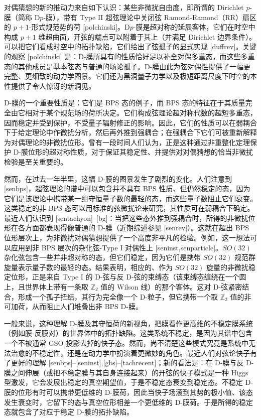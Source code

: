 \documentclass[11pt,a4paper]{ctexart}
\begin{document}
对偶猜想的新的推动力来自如下认识：某些非微扰自由度，即所谓的 Dirichlet \(p\)-膜（简称 D\(p\)-膜），带有 Type II 超弦理论中关闭弦 Ramond-Ramond（RR）扇区的 \(p+1\)-形式规范势的荷 [polchinski]。D\(p\)-膜是超对称的延展客体，它们在时空中构成 \(p+1\) 维超曲面，开弦的端点可以附着于其上（并满足 Dirichlet 边界条件）。可以把它们看成时空中的拓扑缺陷，它们给出了弦孤子的显式实现 [duffrev]。关键的观察 [polchinski] 是：D-膜所具有的性质恰好足以补全对偶多重态，而这些多重态的其他成员是基本弦态与普通的场论孤子。D-膜由此为弦对偶性提供了一幅更完整、更细致的动力学图景。它们还为黑洞量子力学以及极短距离尺度下时空的本性提供了令人惊讶的新洞见。

D-膜的一个重要性质是：它们是 BPS 态的例子，而 BPS 态的特征在于其质量完全由它相对于某个规范场的荷所决定。它们构成弦理论超对称代数的超短多重态，因而稳定并受到保护，不受量子辐射修正的影响。因此，它们的性质可以在弱耦合下于给定理论中作微扰分析，然后再外推到强耦合；在强耦合下它们可被重新解释为对偶理论的非微扰位形。曾有一段时间人们认为，正是这种通过非重整化定理保护 D-膜位形的超对称性质，对于保证其稳定性、并提供对对偶猜想的恰当非微扰检验是至关重要的。

然而，在过去一年半里，这幅 D-膜的图景发生了剧烈的变化。人们注意到 [senbps]，超弦理论的谱中可以包含并不具有 BPS 性质、但仍然稳定的态，因为它们是该理论中携带某一组守恒量子数的最轻的态，而这些量子数阻止它们衰变。这类稳定的非 BPS 态可以用标准的弦微扰论来研究，其性质可在弱耦合下确定。最近人们认识到 [sentachyon]--[bg]：当把这些态外推到强耦合时，所得的非微扰位形在各方面都表现得像普通的 D-膜（近期综述参见 [senrev]）。这就在超出 BPS 位形层次上，为非微扰对偶猜想提供了一个高度非平凡的检验。例如，这一想法可以应用到非 BPS 层次的杂化弦-Type I 对偶性上 [seninst,senparticle]。\(SO(32)\) 杂化弦包含一些并非超对称的态，但它们稳定，因为它们是携带 \(SO(32)\) 规范群旋量表示量子数的最轻的态。结果表明，相应的、作为 \(SO(32)\) 旋量的非微扰稳定位形，正是来自 Type I 的 D-弦与反 D-弦的束缚态（该束缚态缠绕在一个圆上，且世界体上带有一条取 \({\mathbb{Z}}_2\) 值的 Wilson 线）的那个客体。这对 D-弦紧密结合，形成一个孤子扭结，其行为完全像一个 D-粒子，但它携带一个取 \({\mathbb{Z}}_2\) 值的非可加荷，从而阻止人们堆叠出非 BPS D-膜。

一般来说，这种理解 D-膜及其守恒荷的新视角，把膜看作更高维的不稳定膜系统（例如膜-反膜对）的世界体中的拓扑缺陷。这类系统不稳定，是因为其谱中包含一个不被通常 GSO 投影去掉的快子态。然而，尚不清楚这些模式究竟是系统中无法治愈的不稳定性，还是在动力学中扮演着更微妙的角色。最近人们对弦论快子有了更好的理解 [senbps]--[seninst],[gbs]--[tachrecent]；新的看法是：在 D-膜与反 D-膜之间伸展（或把不稳定膜与其自身连接起来）的开弦的快子模式是一种 Higgs 型激发，它会发展出稳定的真空期望值，于是不稳定态衰变到稳定态。不稳定 D-膜的位形有时可以携带更低维的 D-膜荷，因此当快子场滚到其势的极小值、该态发生衰变时，它留下的态与真空位形相差一个更低维的 D-膜荷。于是所得的稳定态就包含了对应于稳定 D-膜的拓扑缺陷。
\end{document}
